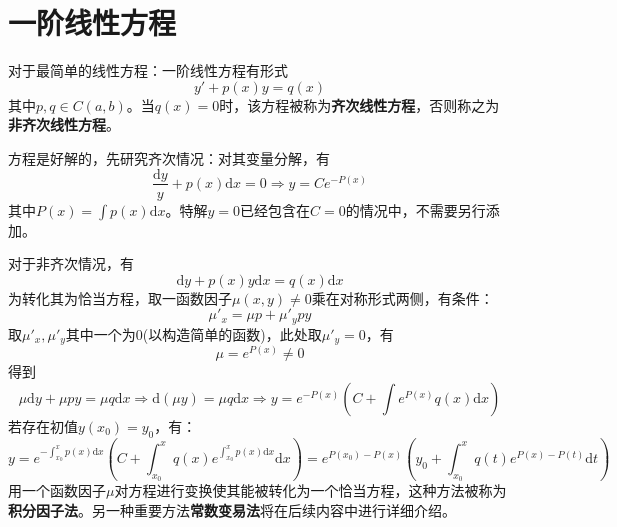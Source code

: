 \documentclass[UTF8]{book}
\renewcommand{\d}{\mathrm{d}}
\newcommand{\To}{\Longrightarrow}
\begin{document}
    \section{一阶线性方程}
    对于最简单的线性方程：一阶线性方程有形式$$y'+p(x)y=q(x)$$其中$p,q\in C(a,b)$。当$q(x)=0$时，该方程被称为\textbf{齐次线性方程}，否则称之为\textbf{非齐次线性方程}。

    方程是好解的，先研究齐次情况：对其变量分解，有$$\frac{\d y}{y}+p(x)\d x=0\To y=Ce^{-P(x)}$$其中$P(x)=\int p(x)\d x$。特解$y=0$已经包含在$C=0$的情况中，不需要另行添加。

    对于非齐次情况，有$$\d y+p(x)y\d x=q(x)\d x$$为转化其为恰当方程，取一函数因子$\mu(x,y)\neq 0$乘在对称形式两侧，有条件：$$\mu'_x=\mu p+\mu'_ypy$$取$\mu'_x,\mu'_y$其中一个为0(以构造简单的函数)，此处取$\mu'_y=0$，有$$\mu=e^{P(x)}\neq 0$$得到$$\mu \d y+\mu py=\mu q\d x\To \d(\mu y)=\mu q\d x\To y=e^{-P(x)}\left(C+\int e^{P(x)}q(x)\d x\right)$$
    若存在初值$y(x_0)=y_0$，有：$$y=e^{-\int^x_{x_0}p(x)\d x}\left(C+\int_{x_0}^xq(x)e^{\int_{x_0}^xp(x)\d x}\d x\right)=e^{P(x_0)-P(x)}\left(y_0+\int_{x_0}^x q(t)e^{P(x)-P(t)}\d t\right)$$
    用一个函数因子$\mu$对方程进行变换使其能被转化为一个恰当方程，这种方法被称为\textbf{积分因子法}。另一种重要方法\textbf{常数变易法}将在后续内容中进行详细介绍。
\end{document}
